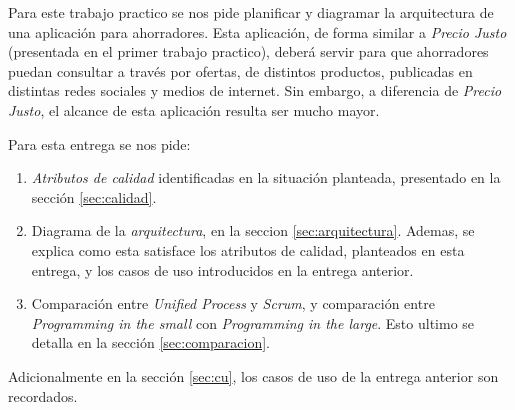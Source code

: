Para este trabajo practico se nos pide planificar y diagramar la arquitectura de una aplicación para ahorradores. Esta aplicación, de forma similar a \emph{Precio Justo} (presentada en el primer trabajo practico), deberá servir para que ahorradores puedan consultar a través por ofertas, de distintos productos, publicadas en distintas redes sociales y medios de internet. Sin embargo, a diferencia de \emph{Precio Justo}, el alcance de esta aplicación resulta ser mucho mayor. 

Para esta entrega se nos pide:
\begin{enumerate}
	\item \emph{Atributos de calidad} identificadas en la situación planteada, presentado en la sección \ref{sec:calidad}.
	\item Diagrama de la \emph{arquitectura}, en la seccion \ref{sec:arquitectura}. Ademas, se explica como esta satisface los atributos de calidad, planteados en esta entrega, y los casos de uso introducidos en la entrega anterior.
	\item Comparación entre \emph{Unified Process} y \emph{Scrum}, y comparación entre \emph{Programming in the small} con \emph{Programming in the large}. Esto ultimo se detalla en la sección \ref{sec:comparacion}.
\end{enumerate}

Adicionalmente en la sección \ref{sec:cu}, los casos de uso de la entrega anterior son recordados.
